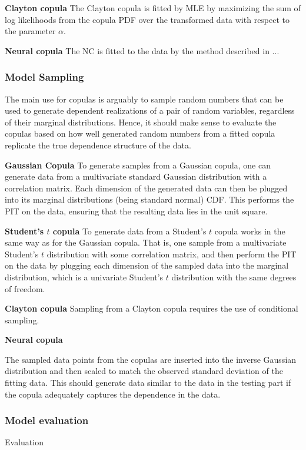 \textbf{Clayton copula}
The Clayton copula is fitted by \gls{MLE} by maximizing the sum of log likelihoods from the copula \gls{PDF} over the transformed data with respect to the parameter $\alpha$. 

\textbf{Neural copula}
The \gls{NC} is fitted to the data by the method described in ... 


\subsubsection{Model Sampling}
The main use for copulas is arguably to sample random numbers that can be used to generate dependent realizations of a pair of random variables, regardless of their marginal distributions. Hence, it should make sense to evaluate the copulas based on how well generated random numbers from a fitted copula replicate the true dependence structure of the data.  

\textbf{Gaussian Copula}
To generate samples from a Gaussian copula, one can generate data from a multivariate standard Gaussian distribution with a correlation matrix. Each dimension of the generated data can then be plugged into its marginal distributions (being standard normal) \gls{CDF}. This performs the \gls{PIT} on the data, ensuring that the resulting data lies in the unit square. 

\textbf{Student's $t$ copula} 
To generate data from a Student's $t$ copula works in the same way as for the Gaussian copula. That is, one sample from a multivariate Student's $t$ distribution with some correlation matrix, and then perform the \gls{PIT} on the data by plugging each dimension of the sampled data into the marginal distribution, which is a univariate Student's $t$ distribution with the same degrees of freedom. 

\textbf{Clayton copula}
Sampling from a Clayton copula requires the use of conditional sampling. 

\textbf{Neural copula}


The sampled data points from the copulas are inserted into the inverse Gaussian distribution and then scaled to match the observed standard deviation of the fitting data. This should generate data similar to the data in the testing part if the copula adequately captures the dependence in the data.

\subsubsection{Model evaluation}
Evaluation




